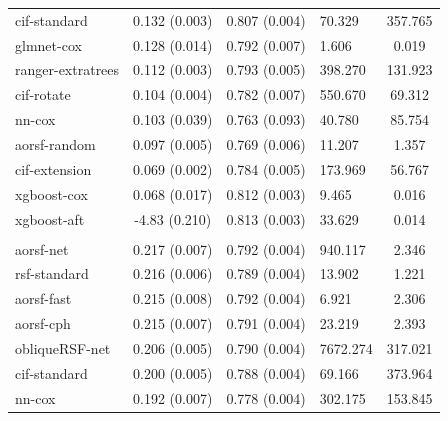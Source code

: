 \documentclass[twoside,11pt]{article}\usepackage[]{graphicx}\usepackage[]{xcolor}
\newenvironment{knitrout}{}{} %
\begin{document}
\begin{knitrout}
\begin{longtable}[t]{lcclc}
\hspace{1em}cif-standard & 0.132 (0.003) & 0.807 (0.004) & 70.329 & 357.765\\
\hspace{1em}glmnet-cox & 0.128 (0.014) & 0.792 (0.007) & 1.606 & 0.019\\
\hspace{1em}ranger-extratrees & 0.112 (0.003) & 0.793 (0.005) & 398.270 & 131.923\\
\hspace{1em}cif-rotate & 0.104 (0.004) & 0.782 (0.007) & 550.670 & 69.312\\
\hspace{1em}nn-cox & 0.103 (0.039) & 0.763 (0.093) & 40.780 & 85.754\\
\hspace{1em}aorsf-random & 0.097 (0.005) & 0.769 (0.006) & 11.207 & 1.357\\
\hspace{1em}cif-extension & 0.069 (0.002) & 0.784 (0.005) & 173.969 & 56.767\\
\hspace{1em}xgboost-cox & 0.068 (0.017) & 0.812 (0.003) & 9.465 & 0.016\\
\hspace{1em}xgboost-aft & -4.83 (0.210) & 0.813 (0.003) & 33.629 & 0.014\\
\addlinespace[0.3em]
\hline
\multicolumn{5}{l}{\textit{\textbf{ARIC; death, n = 13623, p = 41}}}\\
\hline
\hspace{1em}aorsf-net & 0.217 (0.007) & 0.792 (0.004) & 940.117 & 2.346\\
\hspace{1em}rsf-standard & 0.216 (0.006) & 0.789 (0.004) & 13.902 & 1.221\\
\hspace{1em}aorsf-fast & 0.215 (0.008) & 0.792 (0.004) & 6.921 & 2.306\\
\hspace{1em}aorsf-cph & 0.215 (0.007) & 0.791 (0.004) & 23.219 & 2.393\\
\hspace{1em}obliqueRSF-net & 0.206 (0.005) & 0.790 (0.004) & 7672.274 & 317.021\\
\hspace{1em}cif-standard & 0.200 (0.005) & 0.788 (0.004) & 69.166 & 373.964\\
\hspace{1em}nn-cox & 0.192 (0.007) & 0.778 (0.004) & 302.175 & 153.845\\

\end{longtable}
\end{knitrout}
\end{document}

